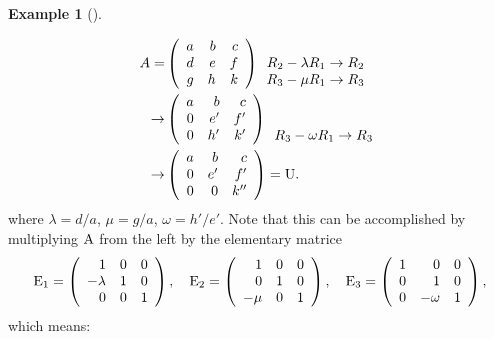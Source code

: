 \documentclass[
  a4paper,
  DIV=11,
  numbers=noendperiod,
  oneside]{scrreprt}
\theoremstyle{definition}
\newtheorem{example}{Example}[chapter]
\theoremstyle{remark}
\begin{document}
\begin{example}[]\protect\hypertarget{exm-lugeneral}{}\label{exm-lugeneral}

\[\begin{aligned}
A = &\left(\begin{array}{rrr}
a & b & c\\
d & e & f\\
g & h & k
\end{array}\right)
\begin{array}{c}
 \\
 R_2-\lambda R_1\rightarrow R_2 \\
 R_3-\mu R_1 \rightarrow R_3
 \end{array} \\
 \rightarrow&
 \left(\begin{array}{rrr}
 a & b & c \\
 0 & e' & f' \\
 0 & h' & k'
 \end{array}\right)
 \begin{array}{c}
 \\
 \\
 R_3-\omega R_1\rightarrow R_3
 \end{array} \\
 \rightarrow&
 \left(\begin{array}{rrr}
 a & b & c \\
 0 & e' & f' \\
 0 & 0 & k''
 \end{array}\right)={\rm U}.
\end{aligned}\] where \(\lambda =d/a\), \(\mu =g/a\), \(\omega =h'/e'\).
Note that this can be accomplished by multiplying \({\rm A}\) from the
left by the elementary matrice \[{\rm E}_1 =\left( 
{{\begin{array}{rrr}
 1  & 0  & 0  \\
 {-\lambda }  & 1  & 0  \\
 0  & 0  & 1  \\
\end{array} }} \right), \quad  {\rm E}_2 =\left( 
{{\begin{array}{rrr}
 1  & 0  & 0  \\
 0  & 1  & 0  \\
 {-\mu }  & 0  & 1  \\
\end{array} }} \right),  \quad   {\rm E}_3 =\left(
\begin{array}{rrr}
 1  & 0  & 0  \\
 0  & 1  & 0  \\
 0  & - \omega  & 1  \\
\end{array} \right),\] which means:\\


\end{example}
\end{document}
